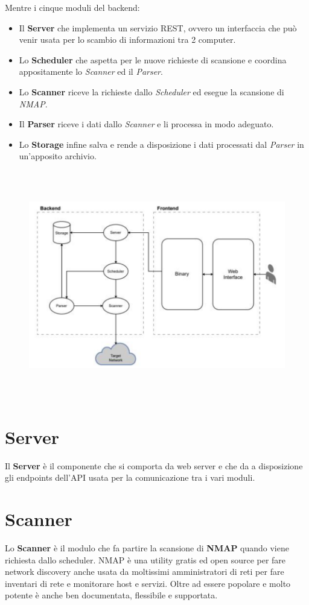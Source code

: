 \documentclass[target=bach,aauheader=,style=]{thud}
\begin{document}
Mentre i cinque moduli del backend:
\begin{itemize}
  \item Il \textbf{Server} che implementa un servizio REST, ovvero un interfaccia che può venir usata per lo scambio di informazioni tra 2 computer.
  \item Lo \textbf{Scheduler} che aspetta per le nuove richieste di scansione e coordina appositamente lo \textit{Scanner} ed il \textit{Parser}.
  \item Lo \textbf{Scanner} riceve la richieste dallo \textit{Scheduler} ed esegue la scansione di \textit{NMAP}.
  \item Il \textbf{Parser} riceve i dati dallo \textit{Scanner} e li processa in modo adeguato.
  \item Lo \textbf{Storage} infine salva e rende a disposizione i dati processati dal \textit{Parser} in un'apposito archivio.
\end{itemize}

\begin{figure}[h]
\includegraphics[width=15cm, height=10cm]{moduli}
\centering
\end{figure}

\section{Server}
Il \textbf{Server} è il componente che si comporta da web server e che da a disposizione gli endpoints dell'API usata per la comunicazione tra i vari moduli.

\section{Scanner}
Lo \textbf{Scanner} è il modulo che fa partire la scansione di \textbf{NMAP} quando viene richiesta dallo scheduler. 
NMAP è una utility gratis ed open source per fare network discovery anche usata da moltissimi amministratori di reti per fare inventari di rete e monitorare host e servizi. 
Oltre ad essere popolare e molto potente è anche ben documentata, flessibile e supportata.
\end{document}
